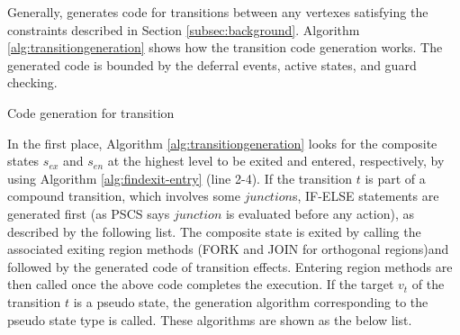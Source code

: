 Generally,  generates code for transitions between any vertexes satisfying the constraints described in Section \ref{subsec:background}. Algorithm \ref{alg:transitiongeneration} shows how the transition code generation works. The generated code is bounded by the deferral events, active states, and guard checking.

\begin{algorithm}[]
	\caption{Code generation for transition
		\label{alg:transitiongeneration}}
	\begin{algorithmic}[1]
		\EndFor
		\EndIf
		\EndFor
		\Else
		\EndIf
		\EndFor
		\EndIf
		\Else
		\EndIf
		\EndProcedure	
	\end{algorithmic}
\end{algorithm}

In the first place, Algorithm \ref{alg:transitiongeneration} looks for the composite states $s_{ex}$ and $s_{en}$ at the highest level to be exited and entered, respectively, by using Algorithm \ref{alg:findexit-entry} (line 2-4). 
If the transition $t$ is part of a compound transition, which involves some $junction$s, IF-ELSE statements are generated first (as PSCS says $junction$ is evaluated before any action), as described by the following list. 
The composite state is exited by calling the associated exiting region methods (FORK and JOIN for orthogonal regions)and followed by the generated code of transition effects. Entering region methods are then called once the above code completes the execution. If the target $v_t$ of the transition $t$ is a pseudo state, the generation algorithm corresponding to the pseudo state type is called. These algorithms are shown as the below list. 
 

